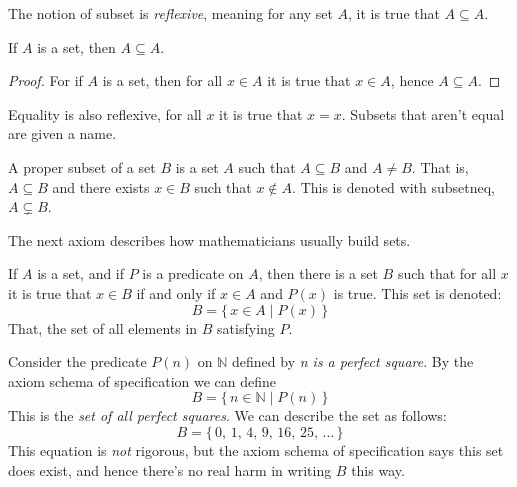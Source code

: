             The notion of subset is \textit{reflexive}, meaning for any set
            $A$, it is true that $A\subseteq{A}$.
            \begin{theorem}
                If $A$ is a set, then $A\subseteq{A}$.
            \end{theorem}
            \begin{proof}
                For if $A$ is a set, then for all $x\in{A}$ it is true that
                $x\in{A}$, hence $A\subseteq{A}$.
            \end{proof}
            Equality is also reflexive, for all $x$ it is true that $x=x$.
            Subsets that aren't equal are given a name.
            \begin{definition}
                A \gls{proper subset} of a set $B$ is a set $A$ such that
                $A\subseteq{B}$ and $A\ne{B}$. That is, $A\subseteq{B}$ and
                there exists $x\in{B}$ such that $x\notin{A}$. This is denoted
                with \gls{subsetneq}, $A\subsetneq{B}$.
            \end{definition}
            The next axiom describes how mathematicians usually build sets.
            \begin{axiom}
                If $A$ is a set, and if $P$ is a predicate on $A$, then there
                is a set $B$ such that for all $x$ it is true that $x\in{B}$ if
                and only if $x\in{A}$ and $P(x)$ is true. This set is denoted:
                \begin{equation}
                    B=\{\,x\in{A}\;|\;P(x)\,\}
                \end{equation}
                That, the set of all elements in $B$ satisfying $P$.%
            \end{axiom}
            \begin{example}
                Consider the predicate $P(n)$ on $\mathbb{N}$ defined by
                \textit{n is a perfect square}. By the axiom schema of
                specification we can define
                \begin{equation}
                    B=\{\,n\in\mathbb{N}\;|\;P(n)\,\}
                \end{equation}
                This is the \textit{set of all perfect squares}. We can describe
                the set as follows:
                \begin{equation}
                    B=\{\,0,\,1,\,4,\,9,\,16,\,25,\,\dots\,\}
                \end{equation}
                This equation is \textit{not} rigorous, but the axiom schema of
                specification says this set does exist, and hence there's no
                real harm in writing $B$ this way.
            \end{example}
